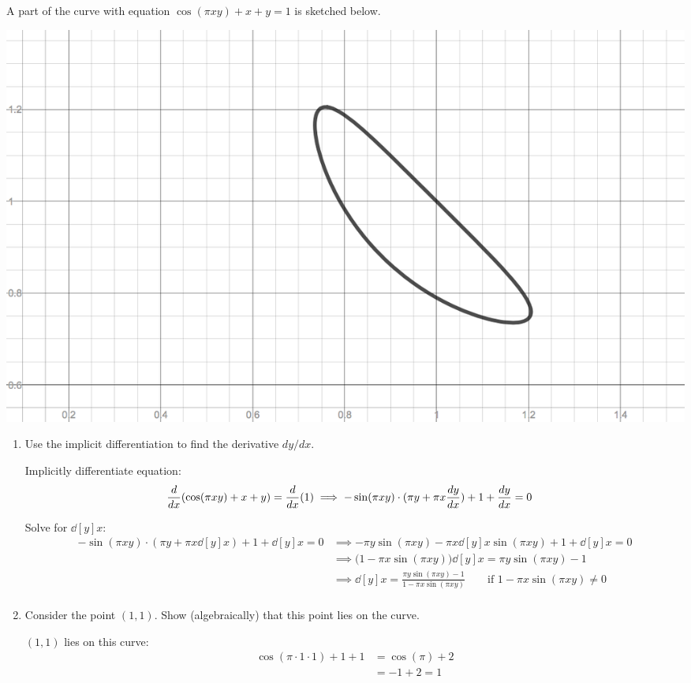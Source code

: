 \documentclass[nooutcomes]{ximera}
\begin{document}
\begin{problem}  A part of the curve with equation $\cos(\pi x y) + x + y = 1$ is sketched below.

  \begin{image}
    \includegraphics[scale = 0.3]{figure4.png}
  \end{image}
  \begin{enumerate}
    \item
      Use the implicit differentiation to find the derivative $dy/dx$.
      \begin{freeResponse}
        Implicitly differentiate equation:
        \begin{align*}
          \ddx( \cos(\pi x y) + x + y) = \ddx(1) &\implies -\sin(\pi x y)\cdot(\pi y + \pi x \dd[y]{x}) + 1 + \dd[y]{x} = 0 
        \end{align*}

        Solve for $\dd[y]{x}$:
        \begin{align*}
          -\sin(\pi x y)\cdot(\pi y + \pi x \dd[y]{x}) + 1 + \dd[y]{x} = 0 &\implies -\pi y \sin(\pi x y) - \pi x \dd[y]{x} \sin(\pi x y) + 1 + \dd[y]{x} = 0 \\
          &\implies  \bigl(1 - \pi x \sin(\pi x y)\bigr)\dd[y]{x} = \pi y \sin(\pi x y) - 1 \\
          &\implies \dd[y]{x} = \frac{\pi y \sin(\pi x y) - 1}{1 - \pi x \sin(\pi x y)} \hspace{2em} \mbox{if $1 - \pi x \sin(\pi x y) \ne 0$}\\
        \end{align*}
      \end{freeResponse}

    \item
      Consider the point $(1, 1)$.
      Show (algebraically) that this point lies on the curve.
      \begin{freeResponse}
        $(1, 1)$ lies on this curve:
        \begin{align*}
          \cos(\pi \cdot 1 \cdot 1) + 1 + 1 &= \cos(\pi) + 2\\
          &= -1 + 2 = 1
        \end{align*}
      \end{freeResponse}


\end{enumerate}
\end{problem}
\end{document}
